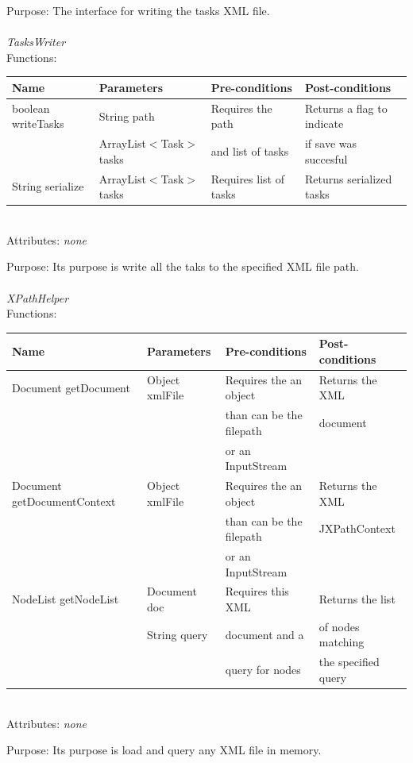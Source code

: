 Purpose: The interface for writing the tasks XML file.
\\
\\
\emph{TasksWriter}\\
Functions:\\
\begin{tabular}{| l | l | l | l |}
\hline
Name & Parameters & Pre-conditions & Post-conditions\\
\hline
		boolean writeTasks 			& String path       			& Requires the path		& Returns a flag to indicate \\
                                                                                    & ArrayList$<$Task$>$ tasks             & and list of tasks 		 &  if save was succesful \\
\hline
		String serialize 			& ArrayList$<$Task$>$ tasks		& Requires list of tasks	& Returns serialized tasks
\\
\hline
\end{tabular}
\\

Attributes: \emph{none}

Purpose: Its purpose is write all the taks to the specified XML file path.
\\
\\

\emph{XPathHelper}\\
Functions:\\
\begin{tabular}{| l | l | l | l |}
\hline
Name & Parameters & Pre-conditions & Post-conditions\\
\hline
		Document getDocument 		& Object xmlFile       			& Requires the an object	& Returns the XML\\
                                                                                    & 				             & than can be the filepath    	& document \\
							& 					& or an InputStream		& \\
\hline
		Document getDocumentContext	& Object xmlFile       			& Requires the an object	& Returns the XML \\
                                                                                    & 				             & than can be the filepath    	& JXPathContext \\
							& 					& or an InputStream		& \\
\hline
		NodeList getNodeList			& Document doc       			& Requires this XML 		 & Returns the list \\
                                                                                    & String query			            & document and a    		& of nodes matching \\
							& 					& query for nodes		& the specified query
\\
\hline
\end{tabular}
\\

Attributes: \emph{none}

Purpose: Its purpose is load and query any XML file in memory.
\\
\\